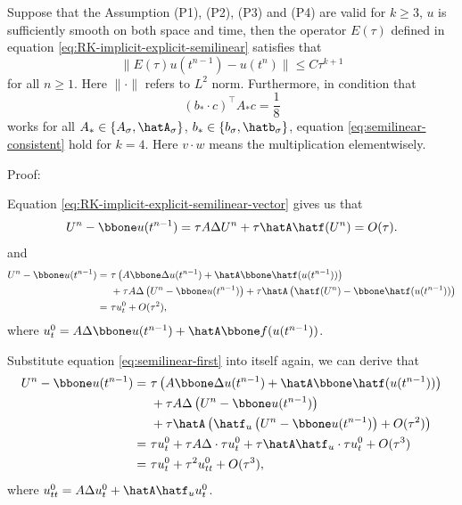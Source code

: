 \begin{theorem}
    Suppose that the Assumption (P1), (P2), (P3) and (P4) are valid for $k \geq 3$, 
    $u$ is sufficiently smooth on both space and time, then  
    the operator $E(\tau)$ defined in equation \eqref{eq:RK-implicit-explicit-semilinear} 
    satisfies that 
    \begin{equation}\label{eq:semilinear-consistent}
        \|E(\tau) u(t^{n-1}) - u(t^{n})\| \leq C\tau^{k+1}
    \end{equation}
    for all $n \geq 1$. Here $\|\cdot\|$ refers to $L^2$ norm.
    Furthermore, 
    in condition that 
    $$(b_* \cdot c)^\top A_* c = \frac18$$  
    works for all $A_* \in \{A_\sigma, \hatA_\sigma\}$, 
    $b_* \in \{b_\sigma, \hatb_\sigma\}$, 
 equation \eqref{eq:semilinear-consistent} hold for $k=4$. 
 Here $ v\cdot w$ means the multiplication elementwisely. 
\end{theorem}

Proof: 

Equation \eqref{eq:RK-implicit-explicit-semilinear-vector} gives us that 
\begin{equation}\label{eq:semilinear-start}
    U^n - \bbone u(t^{n-1}) = \tau A \Delta U^n + \tau \hatA \hatf(U^n) = O(\tau).
\end{equation}
and 
\begin{equation}\label{eq:semilinear-first}
    \begin{aligned}
    U^n - \bbone u(t^{n-1}) =~& \tau \left(A  \bbone\Delta u(t^{n-1}) + \hatA \bbone \hatf(u(t^{n-1})) \right)\\
    &+ \tau A \Delta\left(U^n - \bbone u(t^{n-1})\right) + \tau \hatA \left(\hatf(U^n) - \bbone \hatf(u(t^{n-1}))\right)\\
    =~& \tau u_t^0 + O(\tau^2), 
    \end{aligned}
\end{equation}
where $u_t^0 = A \Delta \bbone u(t^{n-1}) + \hatA \bbone f(u(t^{n-1}))$. 

Substitute equation \eqref{eq:semilinear-first} into itself again, 
we can derive that 
\begin{equation}\label{eq:semilinear-second}
    \begin{aligned}
    U^n - \bbone u(t^{n-1}) =~& \tau \left(A  \bbone\Delta u(t^{n-1}) + \hatA \bbone \hatf(u(t^{n-1})) \right)\\
    &+ \tau A \Delta\left(U^n - \bbone u(t^{n-1})\right) \\
    &+ \tau \hatA \left(\hatf_u\left(U^n - \bbone u(t^{n-1})\right) + O(\tau^2)\right)\\
    =~& \tau u_t^0 + \tau A\Delta \cdot \tau u_t^0 + \tau \hatA \hatf_u \cdot \tau u_t^0  + O(\tau^3)\\
    =~& \tau u_t^0 + \tau^2 u_{tt}^0 + O(\tau^3), 
    \end{aligned}
\end{equation}
where $u_{tt}^0 = A \Delta u_t^0 + \hatA \hatf_u u_t^0$. 

